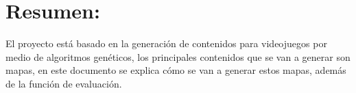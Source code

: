 %
%

\section*{Resumen:}

El proyecto está basado en la generación de contenidos para videojuegos por medio de algoritmos genéticos, los principales contenidos que se van a generar son mapas, en este documento se explica cómo se van a generar estos mapas, además de la función de evaluación.

